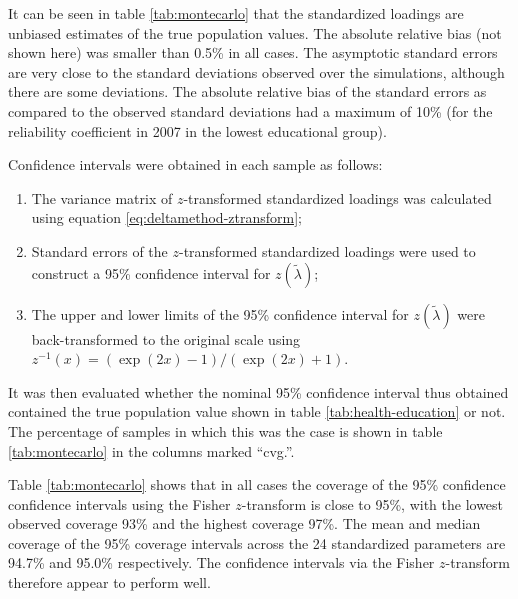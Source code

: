 \documentclass[a4paper,11pt]{article}
\renewcommand{\l}{\lambda}
\newcommand{\0}{\boldsymbol{0}}
\begin{document}
It can be seen in table \ref{tab:montecarlo} that the standardized loadings are unbiased estimates of the
 true population values. The absolute relative bias (not shown here) was smaller than 0.5\% in all cases.
The asymptotic standard errors are very close to the standard deviations observed over the simulations, 
although there are some deviations. 
The absolute relative bias of the standard errors as compared to the observed standard deviations 
had a maximum of 10\% (for the reliability coefficient in 2007 in the lowest educational group). 

Confidence intervals were obtained in each sample as follows: 
\begin{enumerate}
\item  The variance matrix of $z$-transformed standardized loadings was calculated using equation 
		\ref{eq:deltamethod-ztransform};
\item Standard errors of the $z$-transformed standardized loadings were used to construct a 95\%
		confidence interval for $z(\tilde\l)$;
\item The upper and lower limits of the 95\% confidence interval for $z(\tilde\l)$ were back-transformed
		to the original scale using $z^{-1}(x) = (\exp(2x) - 1) / (\exp(2x) + 1)$.
\end{enumerate}
It was then evaluated whether the nominal 95\% confidence interval thus obtained contained the true population
value shown in table \ref{tab:health-education} or not. The percentage of samples in which this was the case is 
shown in table \ref{tab:montecarlo} in the columns marked ``cvg.''. 

Table \ref{tab:montecarlo} shows that in all cases the coverage of the 95\% confidence confidence 
intervals using the Fisher $z$-transform is close to 95\%, with the lowest observed coverage 93\%  
and the highest coverage 97\%. The mean and median coverage of the 95\% coverage intervals 
across the 24 standardized parameters are 94.7\% and 95.0\% respectively. The confidence intervals via the Fisher
$z$-transform therefore appear to perform well.
\end{document}
